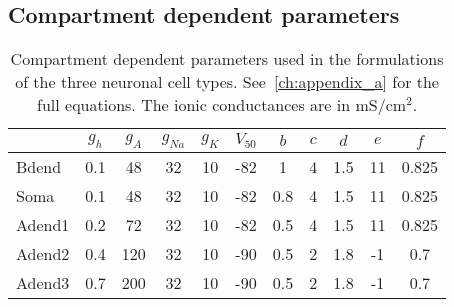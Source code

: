 \subsection{Compartment dependent parameters}
\begin{table}[htbp]
    \centering
    \caption[Compartment dependent parameters]{Compartment dependent parameters used in the formulations of the three neuronal cell types. See~\ref{ch:appendix_a} for the full equations. The ionic conductances are in mS/cm\(^2\).}\label{table:compartment_dependent_parameters_appendix}
    \begin{tabular}{l|cccccccccc}
        \hline
        \hline
               & \( g_{h} \) & \( g_{A} \) & \( g_{Na} \) & \( g_{K} \) & \( V_{50} \) & \( b \) & \( c \) & \( d \) & \( e \) & \( f \) \\
        \hline
        Bdend  & 0.1         & 48          & 32           & 10          & -82          & 1       & 4       & 1.5     & 11      & 0.825   \\
        Soma   & 0.1         & 48          & 32           & 10          & -82          & 0.8     & 4       & 1.5     & 11      & 0.825   \\
        Adend1 & 0.2         & 72          & 32           & 10          & -82          & 0.5     & 4       & 1.5     & 11      & 0.825   \\
        Adend2 & 0.4         & 120         & 32           & 10          & -90          & 0.5     & 2       & 1.8     & -1      & 0.7     \\
        Adend3 & 0.7         & 200         & 32           & 10          & -90          & 0.5     & 2       & 1.8     & -1      & 0.7     \\
        \hline
        \hline
    \end{tabular}
\end{table}

